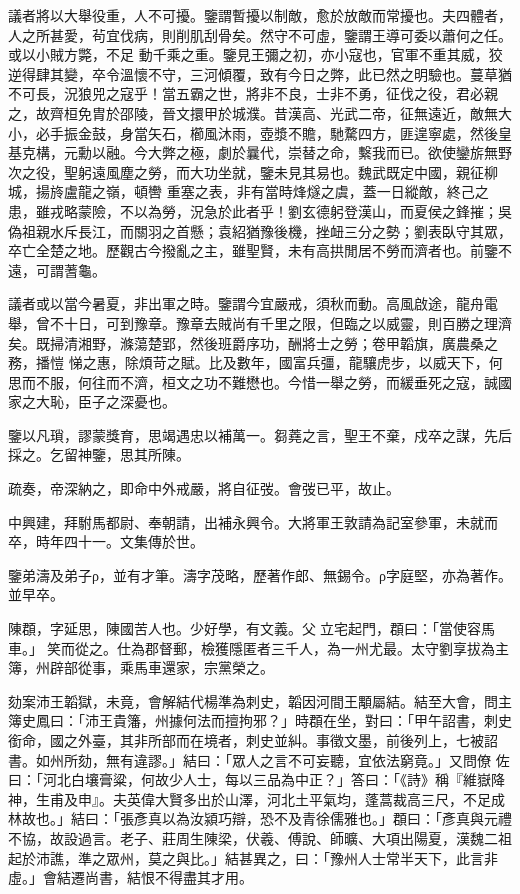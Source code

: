 \begin{pinyinscope}
 議者將以大舉役重，人不可擾。鑒謂暫擾以制敵，愈於放敵而常擾也。夫四體者，人之所甚愛，茍宜伐病，則削肌刮骨矣。然守不可虛，鑒謂王導可委以蕭何之任。或以小賊方斃，不足
 動千乘之重。鑒見王彌之初，亦小寇也，官軍不重其威，狡逆得肆其變，卒令溫懷不守，三河傾覆，致有今日之弊，此已然之明驗也。蔓草猶不可長，況狼兕之寇乎！當五霸之世，將非不良，士非不勇，征伐之役，君必親之，故齊桓免胄於邵陵，晉文擐甲於城濮。昔漢高、光武二帝，征無遠近，敵無大小，必手振金鼓，身當矢石，櫛風沐雨，壺漿不贍，馳騖四方，匪遑寧處，然後皇基克構，元勳以融。今大弊之極，劇於曩代，崇替之命，繫我而已。欲使鑾旂無野次之役，聖躬遠風塵之勞，而大功坐就，鑒未見其易也。魏武既定中國，親征柳城，揚旍盧龍之嶺，頓轡
 重塞之表，非有當時烽燧之虞，蓋一日縱敵，終己之患，雖戎略蒙險，不以為勞，況急於此者乎！劉玄德躬登漢山，而夏侯之鋒摧；吳偽祖親水斥長江，而關羽之首懸；袁紹猶豫後機，挫衄三分之勢；劉表臥守其眾，卒亡全楚之地。歷觀古今撥亂之主，雖聖賢，未有高拱閒居不勞而濟者也。前鑒不遠，可謂蓍龜。



 議者或以當今暑夏，非出軍之時。鑒謂今宜嚴戒，須秋而動。高風啟途，龍舟電舉，曾不十日，可到豫章。豫章去賊尚有千里之限，但臨之以威靈，則百勝之理濟矣。既掃清湘野，滌蕩楚郢，然後班爵序功，酬將士之勞；卷甲韜旗，廣農桑之務，播愷
 悌之惠，除煩苛之賦。比及數年，國富兵彊，龍驤虎步，以威天下，何思而不服，何往而不濟，桓文之功不難懋也。今惜一舉之勞，而緩垂死之寇，誠國家之大恥，臣子之深憂也。



 鑒以凡瑣，謬蒙獎育，思竭遇忠以補萬一。芻蕘之言，聖王不棄，戍卒之謀，先后採之。乞留神鑒，思其所陳。



 疏奏，帝深納之，即命中外戒嚴，將自征弢。會弢已平，故止。



 中興建，拜駙馬都尉、奉朝請，出補永興令。大將軍王敦請為記室參軍，未就而卒，時年四十一。文集傳於世。



 鑒弟濤及弟子ρ，並有才筆。濤字茂略，歷著作郎、無錫令。ρ字庭堅，亦為著作。並早卒。



 陳頵，字延思，陳國苦人也。少好學，有文義。父立宅起門，頵曰：「當使容馬車。」笑而從之。仕為郡督郵，檢獲隱匿者三千人，為一州尤最。太守劉享拔為主簿，州辟部從事，乘馬車還家，宗黨榮之。



 劾案沛王韜獄，未竟，會解結代楊準為刺史，韜因河間王顒屬結。結至大會，問主簿史鳳曰：「沛王貴籓，州據何法而擅拘邪？」時頵在坐，對曰：「甲午詔書，刺史銜命，國之外臺，其非所部而在境者，刺史並糾。事徵文墨，前後列上，七被詔書。如州所劾，無有違謬。」結曰：「眾人之言不可妄聽，宜依法窮竟。」又問僚
 佐曰：「河北白壤膏粱，何故少人士，每以三品為中正？」答曰：「《詩》稱『維嶽降神，生甫及申』。夫英偉大賢多出於山澤，河北土平氣均，蓬蒿裁高三尺，不足成林故也。」結曰：「張彥真以為汝潁巧辯，恐不及青徐儒雅也。」頵曰：「彥真與元禮不協，故設過言。老子、莊周生陳梁，伏羲、傅說、師曠、大項出陽夏，漢魏二祖起於沛譙，準之眾州，莫之與比。」結甚異之，曰：「豫州人士常半天下，此言非虛。」會結遷尚書，結恨不得盡其才用。




\end{pinyinscope}
